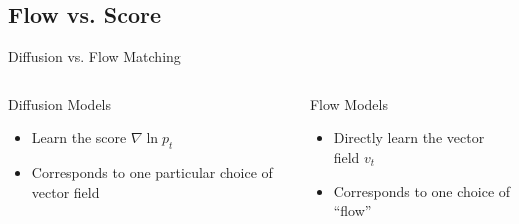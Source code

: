 \documentclass{beamer}
\begin{document}
\subsection{Flow vs. Score}
\begin{frame}{Diffusion vs. Flow Matching}
\begin{columns}

  \begin{column}{0.48\textwidth}
      \begin{alertblock}{Diffusion Models}
      \begin{itemize}
        \item Learn the score \( \nabla \ln p_t \)
        \item Corresponds to one particular choice of vector field
      \end{itemize}
    \end{alertblock}
  \end{column}

  \begin{column}{0.48\textwidth}
      \begin{exampleblock}{Flow Models}
      \begin{itemize}
        \item Directly learn the vector field \( v_t \)
        \item Corresponds to one choice of ``flow''
      \end{itemize}
    \end{exampleblock}
  \end{column}
\end{columns}
\end{frame}
\end{document}

